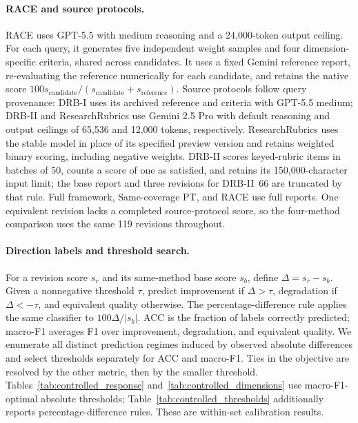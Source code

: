 \documentclass{article}
\begin{document}
\paragraph{RACE and source protocols.}
RACE uses GPT-5.5 with medium reasoning and a 24,000-token output ceiling. For each query, it generates five independent weight samples and four dimension-specific criteria, shared across candidates. It uses a fixed Gemini reference report, re-evaluating the reference numerically for each candidate, and retains the native score $100s_{\mathrm{candidate}}/(s_{\mathrm{candidate}}+s_{\mathrm{reference}})$. Source protocols follow query provenance: DRB-I uses its archived reference and criteria with GPT-5.5 medium; DRB-II and ResearchRubrics use Gemini 2.5 Pro with default reasoning and output ceilings of 65,536 and 12,000 tokens, respectively. ResearchRubrics uses the stable model in place of its specified preview version and retains weighted binary scoring, including negative weights. DRB-II scores keyed-rubric items in batches of 50, counts a score of one as satisfied, and retains its 150,000-character input limit; the base report and three revisions for DRB-II~66 are truncated by that rule. Full framework, Same-coverage PT, and RACE use full reports. One equivalent revision lacks a completed source-protocol score, so the four-method comparison uses the same 119 revisions throughout.

\paragraph{Direction labels and threshold search.}
For a revision score $s_r$ and its same-method base score $s_b$, define $\Delta=s_r-s_b$. Given a nonnegative threshold $\tau$, predict improvement if $\Delta>\tau$, degradation if $\Delta<-\tau$, and equivalent quality otherwise. The percentage-difference rule applies the same classifier to $100\Delta/|s_b|$. ACC is the fraction of labels correctly predicted; macro-F1 averages F1 over improvement, degradation, and equivalent quality. We enumerate all distinct prediction regimes induced by observed absolute differences and select thresholds separately for ACC and macro-F1. Ties in the objective are resolved by the other metric, then by the smaller threshold. Tables~\ref{tab:controlled_response} and~\ref{tab:controlled_dimensions} use macro-F1-optimal absolute thresholds; Table~\ref{tab:controlled_thresholds} additionally reports percentage-difference rules. These are within-set calibration results.
\end{document}
